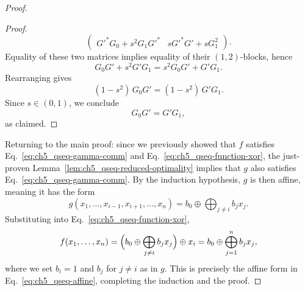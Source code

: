 \begin{proof}
\begin{proof}
\begin{equation}
\begin{pmatrix}
                G'^{*} G_0 + s^2 G_1 G'^{*}
                &
                s G'^{*} G' + s G_1^2
            \end{pmatrix}.
        \end{equation}
        Equality of these two matrices implies equality of their $(1,2)$-blocks, hence
        \begin{equation}
            G_0 G' + s^2 G' G_1
            =
            s^2 G_0 G' + G' G_1 .
        \end{equation}
        Rearranging gives
        \begin{equation}
            (1-s^2)\, G_0 G' = (1-s^2)\, G' G_1 .
        \end{equation}
        Since $s\in(0,1)$, we conclude
        \begin{equation}
            G_0 G' = G' G_1 ,
        \end{equation}
        as claimed.
    \end{proof}

    Returning to the main proof: since we previously showed that $f$ satisfies Eq.~\eqref{eq:ch5_qseq-gamma-comm} and Eq.~\eqref{eq:ch5_qseq-function-xor}, the just-proven Lemma~\ref{lem:ch5_qseq-reduced-optimality} implies that $g$ also satisfies Eq.~\eqref{eq:ch5_qseq-gamma-comm}.
    By the induction hypothesis, $g$ is then affine, meaning it has the form
    \begin{equation}
        g(x_1,\ldots,x_{i-1},x_{i+1},\ldots,x_n) = b_0 \oplus \bigoplus_{j \neq i} b_j x_j.
    \end{equation}
    Substituting into Eq.~\eqref{eq:ch5_qseq-function-xor},
    \begin{equation}
        f(x_1,\ldots,x_n) = \Bigl( b_0 \oplus \bigoplus_{j \neq i} b_j x_j \Bigr) \oplus x_i = b_0 \oplus \bigoplus_{j=1}^n b_j x_j,
    \end{equation}
    where we set $b_i = 1$ and $b_j$ for $j \neq i$ as in $g$.
    This is precisely the affine form in Eq.~\eqref{eq:ch5_qseq-affine}, completing the induction and the proof.
\end{proof}

